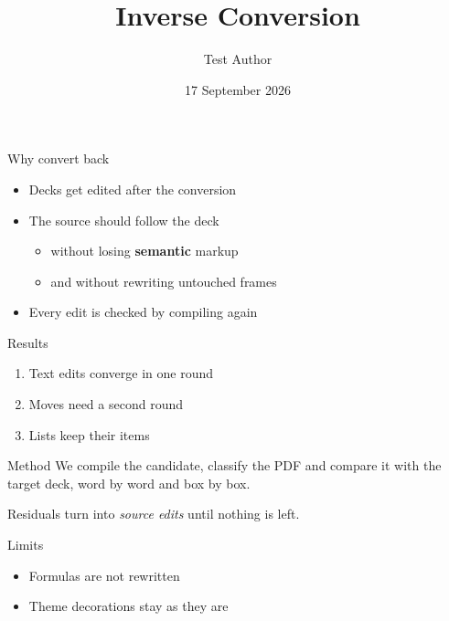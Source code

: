 \documentclass{beamer}
\title{Inverse Conversion}
\author{Test Author}
\date{17 September 2026}
\begin{document}
\begin{frame}[label=title]
  \titlepage
\end{frame}

\begin{frame}[label=motivation]{Why convert back}
  \begin{itemize}
    \item Decks get edited after the conversion
    \item The source should follow the deck
      \begin{itemize}
        \item without losing \textbf{semantic} markup
        \item and without rewriting untouched frames
      \end{itemize}
    \item Every edit is checked by compiling again
  \end{itemize}
\end{frame}

\begin{frame}[label=results]{Results}
  \begin{enumerate}
    \item Text edits converge in one round
    \item Moves need a second round
    \item Lists keep their items
  \end{enumerate}
\end{frame}

\begin{frame}[label=method]{Method}
  We compile the candidate, classify the PDF and compare it with the
  target deck, word by word and box by box.

  Residuals turn into \emph{source edits} until nothing is left.
\end{frame}

\begin{frame}[label=limits]{Limits}
  \begin{itemize}
    \item Formulas are not rewritten
    \item Theme decorations stay as they are
  \end{itemize}
\end{frame}
\end{document}
